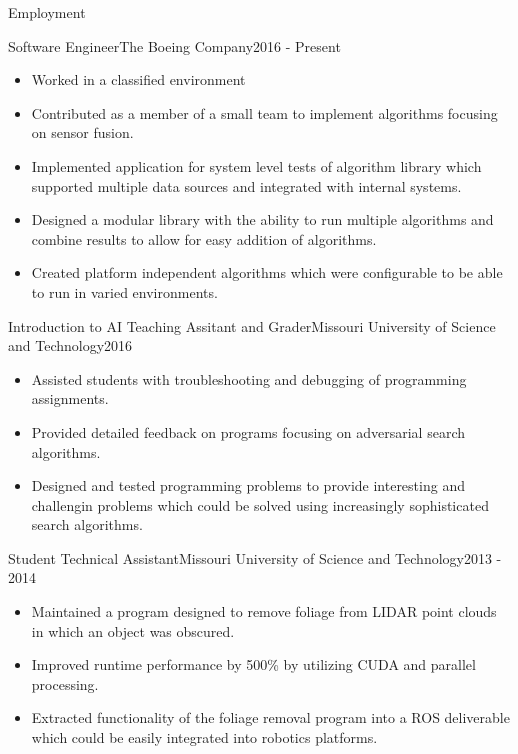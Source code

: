 \documentclass[]{mcdowellcv}
\begin{document}
	\makeheader
	
	\begin{cvsection}{Employment}
        \begin{cvsubsection}{Software Engineer}{The Boeing Company}{2016 - Present}			
			\begin{itemize}
				\item Worked in a classified environment
				\item Contributed as a member of a small team to implement algorithms focusing on sensor fusion.
				\item Implemented application for system level tests of algorithm library which supported multiple data sources and integrated with internal systems. 
                \item Designed a modular library with the ability to run multiple algorithms and combine results to allow for easy addition of algorithms.
                \item Created platform independent algorithms which were configurable to be able to run in varied environments.
			\end{itemize}
		\end{cvsubsection}
		
        \begin{cvsubsection}[2]{Introduction to AI Teaching Assitant and Grader}{Missouri University of Science and Technology}{2016}	
			\begin{itemize}
                \item Assisted students with troubleshooting and debugging of programming assignments.
                \item Provided detailed feedback on programs focusing on adversarial search algorithms.
                \item Designed and tested programming problems to provide interesting and challengin problems which could be solved using increasingly sophisticated search algorithms.
			\end{itemize}
		\end{cvsubsection}
		
        \begin{cvsubsection}[2]{Student Technical Assistant}{Missouri University of Science and Technology}{2013 - 2014}		
			\begin{itemize}
                \item Maintained a program designed to remove foliage from LIDAR point clouds in which an object was obscured.
                \item Improved runtime performance by 500\% by utilizing CUDA and parallel processing.
                \item Extracted functionality of the foliage removal program into a ROS deliverable which could be easily integrated into robotics platforms.
			\end{itemize}
		\end{cvsubsection}
		

\end{cvsection}
\end{document}
